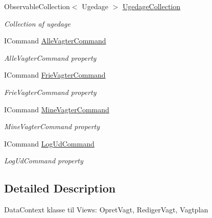 \begin{DoxyCompactItemize}
Observable\+Collection$<$ Ugedage $>$ \hyperlink{class__1aarsproeve_1_1_view_model_1_1_vagtplan_view_model_a2c5e8d56bdec0db35b7e4c4d3f5a8bcb}{Ugedage\+Collection}
\begin{DoxyCompactList}\small\item\em Collection af ugedage \end{DoxyCompactList}\item 
I\+Command \hyperlink{class__1aarsproeve_1_1_view_model_1_1_vagtplan_view_model_a9ff1365b62555d179cf34a5e11a6d5fc}{Alle\+Vagter\+Command}
\begin{DoxyCompactList}\small\item\em Alle\+Vagter\+Command property \end{DoxyCompactList}\item 
I\+Command \hyperlink{class__1aarsproeve_1_1_view_model_1_1_vagtplan_view_model_ac17a43f67342176e4a94bea072876d9c}{Frie\+Vagter\+Command}
\begin{DoxyCompactList}\small\item\em Frie\+Vagter\+Command property \end{DoxyCompactList}\item 
I\+Command \hyperlink{class__1aarsproeve_1_1_view_model_1_1_vagtplan_view_model_abded4dcbd3699986defbf179b9d52001}{Mine\+Vagter\+Command}
\begin{DoxyCompactList}\small\item\em Mine\+Vagter\+Command property \end{DoxyCompactList}\item 
I\+Command \hyperlink{class__1aarsproeve_1_1_view_model_1_1_vagtplan_view_model_aadc2e0233944328d65644e49b449f89b}{Log\+Ud\+Command}
\begin{DoxyCompactList}\small\item\em Log\+Ud\+Command property \end{DoxyCompactList}\end{DoxyCompactItemize}


\subsection{Detailed Description}
Data\+Context klasse til Views\+: Opret\+Vagt, Rediger\+Vagt, Vagtplan 



